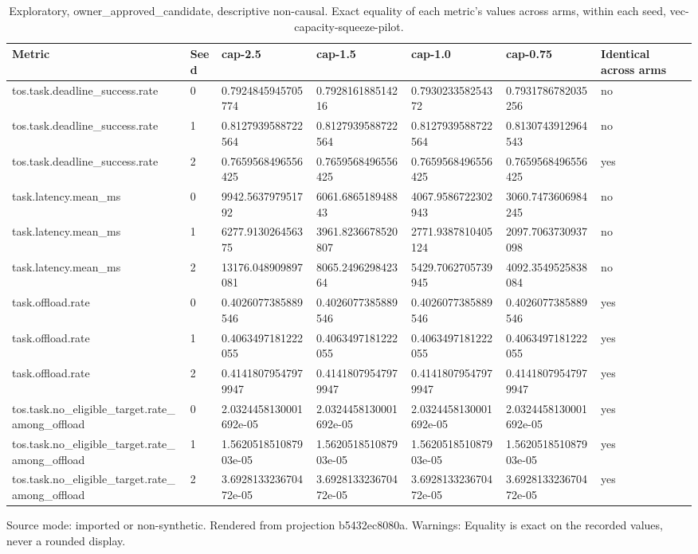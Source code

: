 {
\begin{table}[htbp]
\centering
\caption{Exploratory, owner\_approved\_candidate, descriptive non-causal. Exact equality of each metric's values across arms, within each seed, vec-capacity-squeeze-pilot.}
\label{tab:traffictwin-metrics-b5432ec8080a}
\small
\renewcommand{\arraystretch}{1.15}
\begin{tabular}{lllllll}
\hline
Metric & Seed & cap-2.5 & cap-1.5 & cap-1.0 & cap-0.75 & Identical across arms \\
\hline
tos.task.deadline\_success.rate & 0 & 0.7924845945705774 & 0.792816188514216 & 0.793023358254372 & 0.7931786782035256 & no \\
tos.task.deadline\_success.rate & 1 & 0.8127939588722564 & 0.8127939588722564 & 0.8127939588722564 & 0.8130743912964543 & no \\
tos.task.deadline\_success.rate & 2 & 0.7659568496556425 & 0.7659568496556425 & 0.7659568496556425 & 0.7659568496556425 & yes \\
task.latency.mean\_ms & 0 & 9942.563797951792 & 6061.686518948843 & 4067.9586722302943 & 3060.7473606984245 & no \\
task.latency.mean\_ms & 1 & 6277.913026456375 & 3961.8236678520807 & 2771.9387810405124 & 2097.7063730937098 & no \\
task.latency.mean\_ms & 2 & 13176.048909897081 & 8065.249629842364 & 5429.7062705739945 & 4092.3549525838084 & no \\
task.offload.rate & 0 & 0.4026077385889546 & 0.4026077385889546 & 0.4026077385889546 & 0.4026077385889546 & yes \\
task.offload.rate & 1 & 0.4063497181222055 & 0.4063497181222055 & 0.4063497181222055 & 0.4063497181222055 & yes \\
task.offload.rate & 2 & 0.41418079547979947 & 0.41418079547979947 & 0.41418079547979947 & 0.41418079547979947 & yes \\
tos.task.no\_eligible\_target.rate\_among\_offload & 0 & 2.0324458130001692e-05 & 2.0324458130001692e-05 & 2.0324458130001692e-05 & 2.0324458130001692e-05 & yes \\
tos.task.no\_eligible\_target.rate\_among\_offload & 1 & 1.562051851087903e-05 & 1.562051851087903e-05 & 1.562051851087903e-05 & 1.562051851087903e-05 & yes \\
tos.task.no\_eligible\_target.rate\_among\_offload & 2 & 3.692813323670472e-05 & 3.692813323670472e-05 & 3.692813323670472e-05 & 3.692813323670472e-05 & yes \\
\hline
\end{tabular}
\par\footnotesize
Source mode: imported or non-synthetic.
Rendered from projection b5432ec8080a.
 Warnings: Equality is exact on the recorded values, never a rounded display.
\end{table}
}
